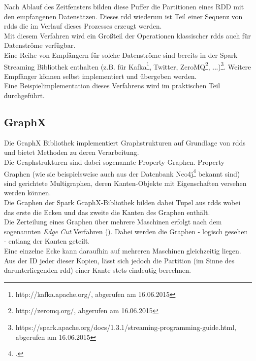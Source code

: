 Nach Ablauf des Zeitfensters bilden diese Puffer die Partitionen eines RDD mit den empfangenen Datensätzen. Dieses \gls{rdd} wiederum ist Teil einer Sequenz von \glspl{rdd} die im Verlauf dieses Prozesses erzeugt werden.\\

Mit diesem Verfahren wird ein Großteil der Operationen klassischer \glspl{rdd} auch für Datenströme verfügbar.\\

Eine Reihe von Empfängern für solche Datenströme sind bereits in der Spark Streaming Bibliothek enthalten (z.B. für Kafka\footnote{http://kafka.apache.org/, abgerufen am 16.06.2015}, Twitter, ZeroMQ\footnote{http://zeromq.org/, abgerufen am 16.06.2015}, ...)\footnote{https://spark.apache.org/docs/1.3.1/streaming-programming-guide.html, abgerufen am 16.06.2015}. Weitere Empfänger können selbst implementiert und übergeben werden.\\

Eine Beispielimplementation dieses Verfahrens wird im praktischen Teil durchgeführt.

\subsection{GraphX}
Die GraphX Bibliothek implementiert Graphstrukturen auf Grundlage von \glspl{rdd} und bietet Methoden zu deren Verarbeitung.\\

Die Graphstrukturen sind dabei sogenannte Property-Graphen. Property-Graphen (wie sie beispielsweise auch aus der Datenbank Neo4j\footcite{http://neo4j.com/, abgerufen am 16.06.2015} bekannt sind) sind gerichtete Multigraphen, deren Kanten-Objekte mit Eigenschaften versehen werden können.\\

Die Graphen der Spark GraphX-Bibliothek bilden dabei Tupel aus \glspl{rdd} wobei das erste die Ecken und das zweite die Kanten des Graphen enthält.\\

Die Zerteilung eines Graphen über mehrere Maschinen erfolgt nach dem sogenannten \textit{Edge Cut} Verfahren (\cite{Gonzalez:2014:GGP:2685048.2685096}). Dabei werden die Graphen - logisch gesehen - entlang der Kanten geteilt.\\

Eine einzelne Ecke kann daraufhin auf mehreren Maschinen gleichzeitig liegen. Aus der ID jeder dieser Kopien, lässt sich jedoch die Partition (im Sinne des darunterliegenden \gls{rdd}) einer Kante stets eindeutig berechnen.\\

